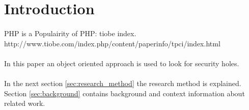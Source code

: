 \documentclass[../main.tex]{subfiles}
\begin{document}
    \section{Introduction}\label{sec:introduction}

    \paragraph{} %
        PHP is a Populairity of PHP: tiobe index. http://www.tiobe.com/index.php/content/paperinfo/tpci/index.html
        
    \paragraph{} %
        
       
    \paragraph{} %
        In this paper an object oriented approach is used to look for security holes.
       
    \paragraph{} %
        In the next section \ref{sec:research_method} the research method is explained.
        Section \ref{sec:background} contains background and context information about related work.
        
        
                    
\end{document}
